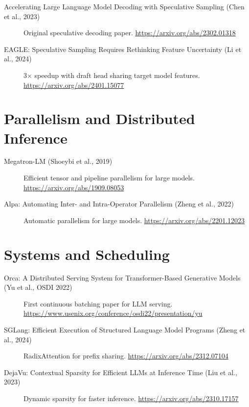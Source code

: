\documentclass[10pt, oneside, openany]{book}
\begin{document}
\begin{description}
  \item[Accelerating Large Language Model Decoding with Speculative Sampling
    (Chen et al., 2023)]
    Original speculative decoding paper.
    \url{https://arxiv.org/abs/2302.01318}

  \item[EAGLE: Speculative Sampling Requires Rethinking Feature Uncertainty
    (Li et al., 2024)]
    3$\times$ speedup with draft head sharing target model features.
    \url{https://arxiv.org/abs/2401.15077}
\end{description}

\section*{Parallelism and Distributed Inference}

\begin{description}
  \item[Megatron-LM (Shoeybi et al., 2019)]
    Efficient tensor and pipeline parallelism for large models.
    \url{https://arxiv.org/abs/1909.08053}

  \item[Alpa: Automating Inter- and Intra-Operator Parallelism (Zheng et al., 2022)]
    Automatic parallelism for large models.
    \url{https://arxiv.org/abs/2201.12023}
\end{description}

\section*{Systems and Scheduling}

\begin{description}
  \item[Orca: A Distributed Serving System for Transformer-Based Generative
    Models (Yu et al., OSDI 2022)]
    First continuous batching paper for LLM serving.
    \url{https://www.usenix.org/conference/osdi22/presentation/yu}

  \item[SGLang: Efficient Execution of Structured Language Model Programs
    (Zheng et al., 2024)]
    RadixAttention for prefix sharing.
    \url{https://arxiv.org/abs/2312.07104}

  \item[DejaVu: Contextual Sparsity for Efficient LLMs at Inference Time
    (Liu et al., 2023)]
    Dynamic sparsity for faster inference.
    \url{https://arxiv.org/abs/2310.17157}
\end{description}
\end{document}
